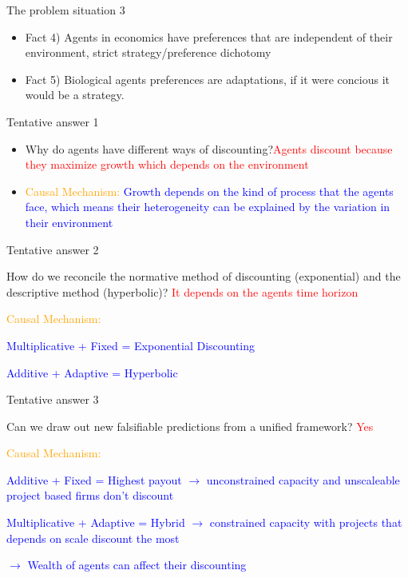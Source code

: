 \documentclass{beamer}
\numberwithin{equation}{section}
\begin{document}
\begin{frame}{The problem situation 3}
\begin{itemize}
    \item Fact 4) Agents in economics have preferences that are independent of their environment, strict strategy/preference dichotomy
    \item Fact 5) Biological agents preferences are adaptations, if it were concious it would be a strategy. 
\end{itemize}
\end{frame}
\begin{frame}{Tentative answer 1}
\begin{itemize}
    \item Why do agents have different ways of discounting?\textcolor{red}{Agents discount because they maximize growth which depends on the environment}
    \item \textcolor{orange}{Causal Mechanism:} \textcolor{blue}{Growth depends on the kind of process that the agents face, which means their heterogeneity can be explained by the variation in their environment}
\end{itemize}
\end{frame}
\begin{frame}{Tentative answer 2}
\begin{itemize}
    \item How do we reconcile the normative method of discounting (exponential) and the descriptive method (hyperbolic)? \textcolor{red}{It depends on the agents time horizon}
    \item \textcolor{orange}{Causal Mechanism:} \textcolor{blue}{
    \item Multiplicative + Fixed = Exponential Discounting
    \item Additive + Adaptive = Hyperbolic}
\end{itemize}
\end{frame}
\begin{frame}{Tentative answer 3}
\begin{itemize}
    \item Can we draw out new falsifiable predictions from a unified framework? \textcolor{red}{Yes}
    \item \textcolor{orange}{Causal Mechanism:} \textcolor{blue}{
    \item Additive + Fixed = Highest payout $\rightarrow$ unconstrained capacity and unscaleable project based firms don't discount
    \item Multiplicative + Adaptive = Hybrid $\rightarrow$ constrained capacity with projects that depends on scale discount the most
    \item $\rightarrow$ Wealth of agents can affect their discounting } 
\end{itemize}
\end{frame}
\end{document}
